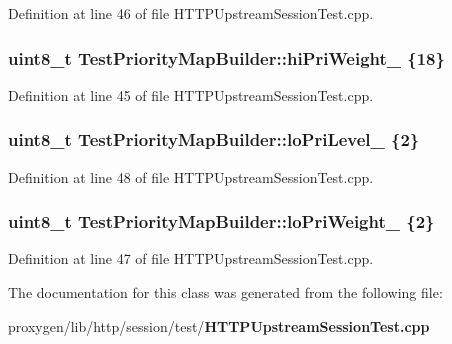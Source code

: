 Definition at line 46 of file H\+T\+T\+P\+Upstream\+Session\+Test.\+cpp.

\subsubsection[{hi\+Pri\+Weight\+\_\+}]{\setlength{\rightskip}{0pt plus 5cm}uint8\+\_\+t Test\+Priority\+Map\+Builder\+::hi\+Pri\+Weight\+\_\+ \{18\}}\label{classTestPriorityMapBuilder_a092a861b14c64e23efb86be5d99ac3d9}


Definition at line 45 of file H\+T\+T\+P\+Upstream\+Session\+Test.\+cpp.

\subsubsection[{lo\+Pri\+Level\+\_\+}]{\setlength{\rightskip}{0pt plus 5cm}uint8\+\_\+t Test\+Priority\+Map\+Builder\+::lo\+Pri\+Level\+\_\+ \{2\}}\label{classTestPriorityMapBuilder_a2092de22ec7070bbd8d207722dbb2460}


Definition at line 48 of file H\+T\+T\+P\+Upstream\+Session\+Test.\+cpp.

\subsubsection[{lo\+Pri\+Weight\+\_\+}]{\setlength{\rightskip}{0pt plus 5cm}uint8\+\_\+t Test\+Priority\+Map\+Builder\+::lo\+Pri\+Weight\+\_\+ \{2\}}\label{classTestPriorityMapBuilder_a7f6953b57c7ea6b85a9cfcb0bc89f764}


Definition at line 47 of file H\+T\+T\+P\+Upstream\+Session\+Test.\+cpp.



The documentation for this class was generated from the following file\+:\begin{DoxyCompactItemize}
\item 
proxygen/lib/http/session/test/{\bf H\+T\+T\+P\+Upstream\+Session\+Test.\+cpp}\end{DoxyCompactItemize}
